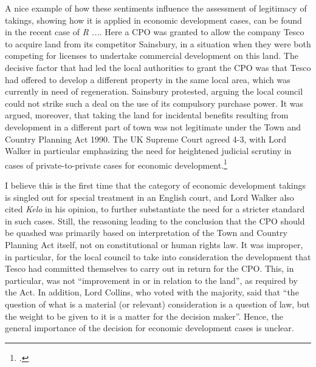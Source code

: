A nice example of how these sentiments influence the assessment of legitimacy of takings, showing how it is applied in economic development cases, can be found in the recent case of {\it R ...}. Here a CPO was granted to allow the company Tesco to acquire land from its competitor Sainsbury, in a situation when they were both competing for licenses to undertake commercial development on this land. The decisive factor that had led the local authorities to grant the CPO was that Tesco had offered to develop a different property in the same local area, which was currently in need of regeneration. Sainsbury protested, arguing the local council could not strike such a deal on the use of its compulsory purchase power. It was argued, moreover, that taking the land for incidental benefits resulting from development in a different part of town was not legitimate under the Town and Country Planning Act 1990. The UK Supreme Court agreed 4-3, with Lord Walker in particular emphasizing the need for heightened judicial scrutiny in cases of private-to-private cases for economic development.\footcite[80-84]{sainsbury10}

I believe this is the first time that the category of economic development takings is singled out for special treatment in an English court, and Lord Walker also cited {\it Kelo} in his opinion, to further substantiate the need for a stricter standard in such cases. Still, the reasoning leading to the conclusion that the CPO should be quashed was primarily based on interpretation of the Town and Country Planning Act itself, not on constitutional or human rights law. It was improper, in particular, for the local council to take into consideration the development that Tesco had committed themselves to carry out in return for the CPO. This, in particular, was not ``improvement in or in relation to the land'', as required by the Act. In addition, Lord Collins, who voted with the majority, said that ``the question of what is a material (or relevant) consideration is a question of law, but the weight to be given to it is a matter for the decision maker''. Hence, the general importance of the decision for economic development cases is unclear. 

